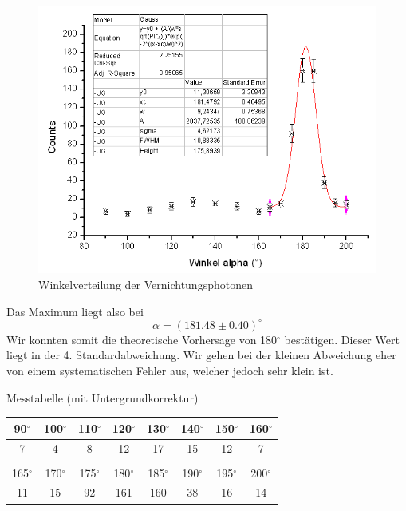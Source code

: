 \begin{figure}[H]
\centering \includegraphics[width = \textwidth]{auswertung/Winkel.png}
\caption{Winkelverteilung der Vernichtungsphotonen}
\end{figure}

Das Maximum liegt also bei
$$\alpha = (181.48 \pm 0.40)^\circ$$
Wir konnten somit die theoretische Vorhersage von 180$^\circ$ bestätigen. Dieser Wert liegt in der 4. Standardabweichung. Wir gehen bei der kleinen Abweichung eher von einem systematischen Fehler aus, welcher jedoch sehr klein ist.

Messtabelle (mit Untergrundkorrektur)

\begin{center}
\begin{tabular}{c c c c c c c c}
90$^\circ$ & 100$^\circ$ & 110$^\circ$ & 120$^\circ$ & 130$^\circ$ & 140$^\circ$ & 150$^\circ$ & 160$^\circ$\\ \hline
7 & 4 & 8 & 12 & 17 & 15 & 12 & 7 \\
& & & & & & & \\
165$^\circ$ & 170$^\circ$ & 175$^\circ$ & 180$^\circ$ & 185$^\circ$ & 190$^\circ$ & 195$^\circ$ & 200$^\circ$\\ \hline
11 & 15 & 92 & 161 & 160 & 38 & 16 & 14\\
\end{tabular}
\end{center}

